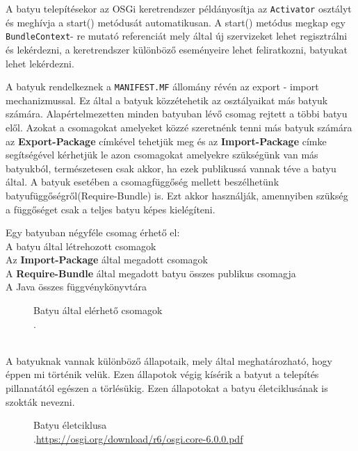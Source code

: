 A batyu telepítésekor az OSGi keretrendszer példányosítja az \texttt{Activator} osztályt és meghívja a start() metódusát automatikusan. A start() metódus megkap egy \texttt{BundleContext}- re mutató referenciát mely által új szervizeket lehet regisztrálni és lekérdezni, a keretrendszer különböző eseményeire lehet feliratkozni, batyukat lehet lekérdezni.

A batyuk rendelkeznek a \texttt{MANIFEST.MF} állomány révén az export - import mechanizmussal. Ez által a batyuk közzétehetik az osztályaikat más batyuk számára. Alapértelmezetten minden batyuban lévő csomag rejtett a többi batyu elől. Azokat a csomagokat amelyeket közzé szeretnénk tenni más batyuk számára az \textbf{Export-Package} címkével tehetjük meg és az \textbf{Import-Package} címke segítségével kérhetjük le azon csomagokat amelyekre szükségünk van más batyukból, természetesen csak akkor, ha ezek publikussá vannak téve a batyu által. A batyuk esetében a csomagfüggőség mellett beszélhetünk batyufüggőségről(Require-Bundle) is. Ezt akkor használják, amennyiben szükség a függőséget csak a teljes batyu képes kielégíteni.

Egy batyuban négyféle csomag érhető el:
\\A batyu által létrehozott csomagok
\\Az \textbf{Import-Package} által megadott csomagok
\\A \textbf{Require-Bundle} által megadott batyu összes publikus csomagja
\\A Java összes függvénykönyvtára
\\
\begin{figure}[h]
  \centering
  \caption[Batyuk elerese]%
  {Batyu által elérhető csomagok\\
  {\white .}\hfill\url{}}
  \label{fig:ALAP:sm1}
\end{figure}


\\ A batyuknak vannak különböző állapotaik, mely által meghatározható, hogy éppen mi történik velük. Ezen állapotok végig kísérik a batyut a telepítés pillanatától egészen a törlésükig. Ezen állapotokat a batyu életciklusának is szokták nevezni.
\\
\begin{figure}[h]
  \centering
  \caption[Batyuk eletciklusa]%
  {Batyu életciklusa\\
  {\white .}\hfill\url{https://osgi.org/download/r6/osgi.core-6.0.0.pdf}}
  \label{fig:ALAP:sm1}
\end{figure}

